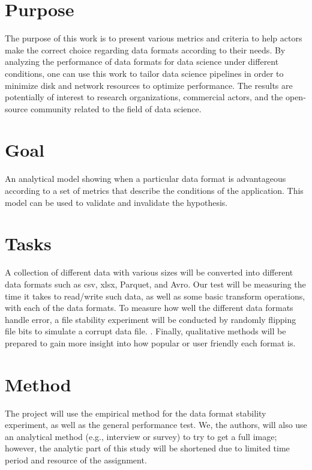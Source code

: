\documentclass[12pt,twoside,english]{article}
\begin{document}
\section{Purpose}
\label{sect:purpose}
The purpose of this work is to present various metrics and criteria to help actors make the correct choice regarding data formats according to their needs. By analyzing the performance of data formats for data science under different conditions, one can use this work to tailor data science pipelines in order to minimize disk and network resources to optimize performance. The results are potentially of interest to research organizations, commercial actors, and the open-source community related to the field of data science. 

\section{Goal}
\label{sect:goals}
An analytical model showing when a particular data format is advantageous according to a set of metrics that describe the conditions of the application. This model can be used to validate and invalidate the hypothesis.

\section{Tasks}
\label{sect:tasks}
A collection of different data with various sizes will be converted into different data formats such as csv, xlsx, Parquet, and Avro. Our test will be measuring the time it takes to read/write such data, as well as some basic transform operations, with each of the data formats. To measure how well the different data formats handle error, a file stability experiment will be conducted by randomly flipping file bits to simulate a corrupt data file. \cite{blomer_quantitative_2018}. Finally, qualitative methods will be prepared to gain more insight into how popular or user friendly each format is.

\section{Method}
\label{sect:method}
The project will use the empirical method \cite{blomer_quantitative_2018} for the data format stability experiment, as well as the general performance test. We, the authors, will also use an analytical method (e.g., interview or survey) to try to get a full image; however, the analytic part of this study will be shortened due to limited time period and resource of the assignment. 
\end{document}
